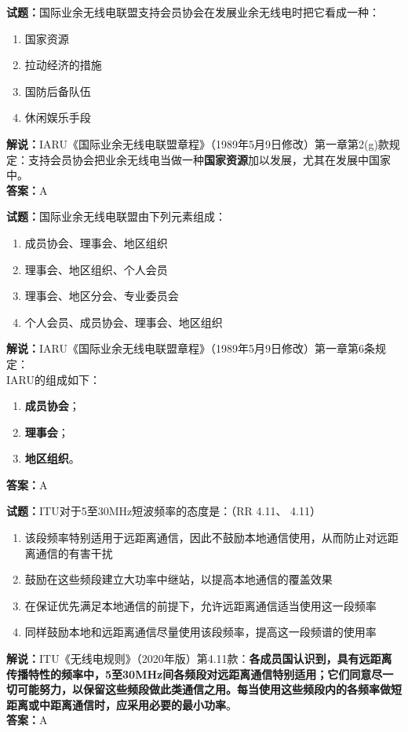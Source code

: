 \documentclass{ctexbook}
\begin{document}
\bigskip




\noindent\textbf{试题：}国际业余无线电联盟支持会员协会在发展业余无线电时把它看成一种：
\begin{enumerate}[leftmargin=3em]
\item 国家资源
\item 拉动经济的措施
\item 国防后备队伍
\item 休闲娱乐手段
\end{enumerate}
\noindent\textbf{解说：}IARU《国际业余无线电联盟章程》（1989年5月9日修改）第一章第2(g)款规定：支持会员协会把业余无线电当做一种\textbf{国家资源}加以发展，尤其在发展中国家中。\\\noindent\textbf{答案：}A


\bigskip




\noindent\textbf{试题：}国际业余无线电联盟由下列元素组成：
\begin{enumerate}[leftmargin=3em]
\item 成员协会、理事会、地区组织
\item 理事会、地区组织、个人会员
\item 理事会、地区分会、专业委员会
\item 个人会员、成员协会、理事会、地区组织
\end{enumerate}
\noindent\textbf{解说：}IARU《国际业余无线电联盟章程》（1989年5月9日修改）第一章第6条规定：\\
IARU的组成如下：
\begin{enumerate}[leftmargin=3em, label=\alph*)]
\item \textbf{成员协会}；
\item \textbf{理事会}；
\item \textbf{地区组织}。
\end{enumerate}
\noindent\textbf{答案：}A



\bigskip




\noindent\textbf{试题：}ITU对于5至30\unit{\MHz}短波频率的态度是：（RR 4.11、 4.11）
\begin{enumerate}[leftmargin=3em]
\item 该段频率特别适用于远距离通信，因此不鼓励本地通信使用，从而防止对远距离通信的有害干扰
\item 鼓励在这些频段建立大功率中继站，以提高本地通信的覆盖效果
\item 在保证优先满足本地通信的前提下，允许远距离通信适当使用这一段频率
\item 同样鼓励本地和远距离通信尽量使用该段频率，提高这一段频谱的使用率
\end{enumerate}
\noindent\textbf{解说：}ITU《无线电规则》（2020年版）第4.11款：\textbf{各成员国认识到，具有远距离传播特性的频率中，5至30\unit{\MHz}间各频段对远距离通信特别适用；它们同意尽一切可能努力，以保留这些频段做此类通信之用。每当使用这些频段内的各频率做短距离或中距离通信时，应采用必要的最小功率}。\\\noindent\textbf{答案：}A
\end{document}
